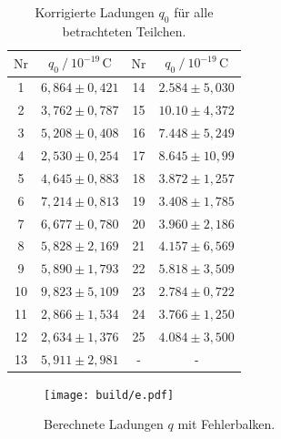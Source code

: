 \begin{table}[H]
  \centering
  \caption{Korrigierte Ladungen $q_0$ für alle betrachteten Teilchen.}
  \label{tab:Ladungen}
  \begin{tabular}{S S S S}
    \toprule
      {$\text{Nr}$} & {$q_0 \mathbin{/} 10^{-19} \, \unit{\coulomb}$} & {$\text{Nr}$} & {$q_0 \mathbin{/} 10^{-19} \,\unit{\coulomb}$}\\
          &       {$6,864 \pm 0,421$}     &     14      &       {$2.584 \pm 5,030$} \\
         2      &       {$3,762 \pm 0,787$}     &     15      &       {$10.10 \pm 4,372$} \\
         3      &       {$5,208 \pm 0,408$}     &     16      &       {$7.448 \pm 5,249$} \\
         4      &       {$2,530 \pm 0,254$}     &     17      &       {$8.645 \pm 10,99$} \\
         5      &       {$4,645 \pm 0,883$}     &     18      &       {$3.872 \pm 1,257$} \\
         6      &       {$7,214 \pm 0,813$}     &     19      &       {$3.408 \pm 1,785$} \\
         7      &       {$6,677 \pm 0,780$}     &     20      &       {$3.960 \pm 2,186$} \\
         8      &       {$5,828 \pm 2,169$}     &     21      &       {$4.157 \pm 6,569$} \\
         9      &       {$5,890 \pm 1,793$}     &     22      &       {$5.818 \pm 3,509$} \\
        10      &       {$9,823 \pm 5,109$}     &     23      &       {$2.784 \pm 0,722$} \\
        11      &       {$2,866 \pm 1,534$}     &     24      &       {$3.766 \pm 1,250$} \\
        12      &       {$2,634 \pm 1,376$}     &     25      &       {$4.084 \pm 3,500$} \\
        13      &       {$5,911 \pm 2,981$}     &     {-}     &             {-}           \\
    \bottomrule
  \end{tabular}
\end{table}


\begin{figure}
  \centering
  \texttt{[image: build/e.pdf]}
  \caption{Berechnete Ladungen $q$ mit Fehlerbalken.}
  \label{fig:ladungen}
\end{figure}

